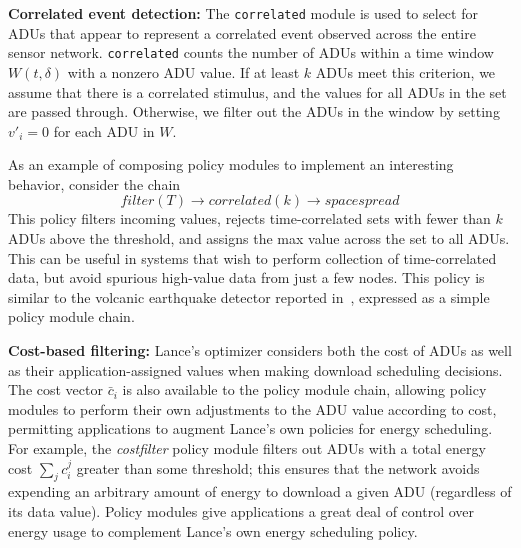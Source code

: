 {\bf Correlated event detection:}
The {\tt correlated} module is used to 
select for ADUs that appear to represent a correlated
event observed across the entire sensor network. 
{\tt correlated} counts the number of ADUs within a time window
$W(t,\delta)$ with a nonzero ADU value.
If at least $k$ ADUs meet this criterion, we assume that there is 
a correlated stimulus, and the values for all ADUs in 
the set are passed through.  Otherwise, we filter out the ADUs in 
the window by setting $v'_i = 0$ for each ADU in $W$.

As an example of composing policy modules to implement an interesting
behavior, consider the chain
\[
\mathit{filter}(T)\rightarrow\mathit{correlated}(k)\rightarrow\mathit{spacespread}
\]
This policy filters incoming values, rejects time-correlated sets 
with fewer than $k$ ADUs above the threshold, and assigns the max
value across the set to all ADUs. This can be useful in 
systems that wish to perform collection of time-correlated data, but
avoid spurious high-value data from just a few nodes. 
This policy is similar to the volcanic earthquake detector reported 
in~\cite{volcano-osdi06}, expressed as a simple policy module chain.

{\bf Cost-based filtering:}
Lance's optimizer considers both the cost of ADUs as well as their
application-assigned values when making download scheduling decisions.
The cost vector $\bar{c}_i$ is also available to the policy module
chain, allowing policy modules to perform their own adjustments to
the ADU value according to cost, permitting applications to augment 
Lance's own policies for energy scheduling. 
For example, the {\em costfilter} policy module filters out ADUs with
a total energy cost $\sum_j c_i^j$ greater than some threshold; this
ensures that the network avoids expending an arbitrary amount of
energy to download a given ADU (regardless of its data value). 
Policy modules give applications a great deal of control over energy 
usage to complement Lance's own energy scheduling policy.

